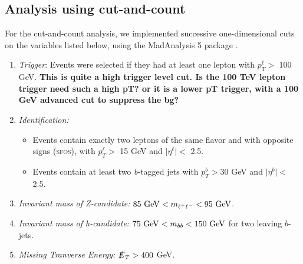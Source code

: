 \documentclass[a4paper,11pt]{article}
\providecommand{\tightlist}{%
     \setlength{\itemsep}{0pt}\setlength{\parskip}{0pt}}
\newcommand{\Shufang}[1]{{\bf\color{Maroon}  #1}}
\newcommand{\met}{{\slashed{E}_T}}
\begin{document}
\subsection{Analysis using cut-and-count}
\label{event-selection}

For the cut-and-count analysis, we implemented successive one-dimensional cuts
on the variables listed below, using the MadAnalysis 5 package
\citep{Conte:2012fm}.

\begin{enumerate}
  \tightlist
  \item \emph{Trigger}: Events were selected if they had at least one lepton
    with $p_{T}^\ell >$ 100 GeV.  \Shufang{This is quite a high trigger level cut.  Is the 100 TeV lepton trigger need such a high pT? or it is a lower pT trigger, with a 100 GeV advanced cut to suppress the bg?}

  \item \emph{Identification:}

    \begin{itemize}
      \item Events contain exactly two leptons of the same flavor
        and with opposite signs (\textsc{sfos}), with $p_{T}^\ell >$ 15 GeV and
        $\vert\eta^\ell\vert <$ 2.5.
      \item Events contain at least two \emph{b}-tagged jets with
        $p_{T}^b > 30$ GeV and $\vert\eta^b\vert <$ 2.5.
    \end{itemize}

  \item \emph{Invariant mass of Z-candidate:}  $85\ {\rm GeV}<m_{\ell^{+}\ell^{-}}<95\ {\rm GeV}$.

  \item \emph{Invariant mass of h-candidate:} $75\ {\rm GeV}<m_{bb}<150\ {\rm GeV}$ for two leaving $b$-jets.

  \item \emph{Missing Tranverse Energy:}  $\met> 400$ GeV.


\end{enumerate}
\end{document}
